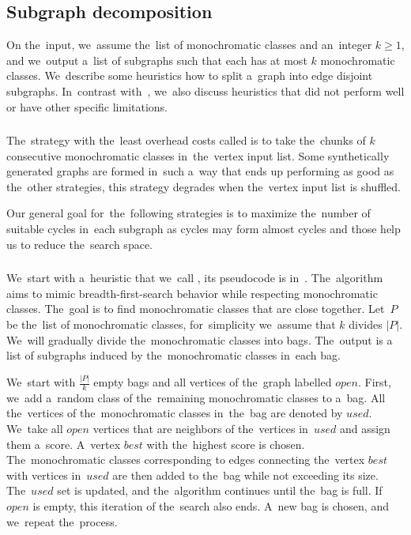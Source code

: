 \subsection{Subgraph decomposition}%
\label{sec:decomposition}

On the~input, we~assume the~list of monochromatic classes
and an~integer $k\geq 1$, and we~output a~list of subgraphs
such that each has at most $k$ monochromatic classes.
We~describe some heuristics how to split a~graph into edge disjoint subgraphs.
In~contrast with~\cite{my_paper}, we~also discuss heuristics
that did not perform well or have other specific limitations.

\subsubsection*{\None{}}

The~strategy with the~least overhead costs called \None{}
is to take the~chunks of $k$ consecutive
monochromatic classes in~the~vertex input list.
Some synthetically generated graphs are formed in~such a~way
that \None{} ends up performing as good as the~other strategies,
this strategy degrades when the~vertex input list is shuffled.

Our general goal for~the~following strategies
is to maximize the~number of suitable cycles in~each
subgraph as cycles may form almost cycles and those help us
to reduce the~search space.

\subsubsection*{\Neighbors{}}

We~start with a~heuristic that we~call \Neighbors{},
its pseudocode is in~.
The~algorithm aims to mimic breadth-first-search
behavior while respecting monochromatic classes.
The~goal is to find monochromatic classes that are close together.
Let~$P$ be the~list of monochromatic classes,
for~simplicity we~assume that $k$ divides $|P|$.
We~will gradually divide the~monochromatic classes into bags.
The~output is a list of subgraphs induced by the~monochromatic classes in~each bag.

We~start with $\frac{|P|}{k}$ empty bags
and all vertices of the~graph labelled $open$.
First, we~add a~random class of the~remaining monochromatic classes to a~bag.
All the~vertices of the~monochromatic classes in~the~bag are denoted by $used$.
We~take all $open$ vertices that are neighbors of the~vertices in~$used$ and assign
them a~score. A~vertex $best$ with the~highest score is chosen.
The~monochromatic classes corresponding to edges connecting the~vertex $best$
with vertices in~$used$ are then added to the~bag while not exceeding its size.
The~$used$ set is updated, and the~algorithm continues until the~bag is full.
If~$open$ is empty, this iteration of the~search also ends.
A~new bag is chosen, and we~repeat the~process.

